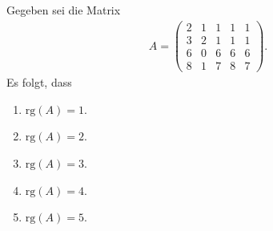 \subsection*{}
Gegeben sei die Matrix
\begin{align*}
	A =
	\begin{pmatrix}
		2 & 1 & 1 & 1 & 1 \\
		3 & 2 & 1 & 1 & 1 \\
		6 & 0 & 6 & 6 & 6 \\ 
		8 & 1 & 7 & 8 & 7
	\end{pmatrix}.
\end{align*}
Es folgt, dass
\renewcommand{\labelenumi}{(\alph{enumi})}
\begin{enumerate}
	\item 
	$ \mathrm{rg}(A) = 1 $.
	\item 
	$ \mathrm{rg}(A) = 2 $.
	\item
	$ \mathrm{rg}(A) = 3 $.
	\item
	$ \mathrm{rg}(A) = 4 $.
	\item
	$ \mathrm{rg}(A) = 5 $.
\end{enumerate}
\ \\

